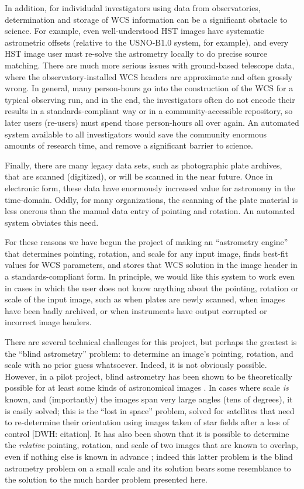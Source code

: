 \documentclass[12pt,preprint]{aastex}
\begin{document}
In addition, for individudal investigators using data from
observatories, determination and storage of WCS information can be a
significant obstacle to science.  For example, even well-understood
HST images have systematic astrometric offsets (relative to the
USNO-B1.0 system, for example), and every HST image user must re-solve
the astrometry locally to do precise source matching.  There are much
more serious issues with ground-based telescope data, where the
observatory-installed WCS headers are approximate and often grossly
wrong.  In general, many person-hours go into the construction of the
WCS for a typical observing run, and in the end, the investigators
often do not encode their results in a standards-compliant way or in a
community-accessible repository, so later users (re-users) must spend
those person-hours all over again.  An automated system available to
all investigators would save the community enormous amounts of
research time, and remove a significant barrier to science.

Finally, there are many legacy data sets, such as photographic plate
archives, that are scanned (digitized), or will be scanned in the near
future.  Once in electronic form, these data have enormously increased
value for astronomy in the time-domain.  Oddly, for many
organizations, the scanning of the plate material is less onerous than
the manual data entry of pointing and rotation.  An automated system
obviates this need.

For these reasons we have begun the project of making an ``astrometry
engine'' that determines pointing, rotation, and scale for any input
image, finds best-fit values for WCS parameters, and stores that WCS
solution in the image header in a standards-compliant form.  In
principle, we would like this system to work even in cases in which
the user does not know anything about the pointing, rotation or scale
of the input image, such as when plates are newly scanned, when images
have been badly archived, or when instruments have output corrupted or
incorrect image headers.

There are several technical challenges for this project, but perhaps
the greatest is the ``blind astrometry'' problem: to determine an
image's pointing, rotation, and scale with no prior guess whatsoever.
Indeed, it is not obviously possible.  However, in a pilot project,
blind astrometry has been shown to be theoretically possible for at
least some kinds of astronomical images \citep{harvey04a}.  In cases
where scale \emph{is} known, and (importantly) the images span very
large angles (tens of degrees), it is easily solved; this is the
``lost in space'' problem, solved for satellites that need to
re-determine their orientation using images taken of star fields after
a loss of control [DWH: citation].  It has also been shown that it is
possible to determine the \emph{relative} pointing, rotation, and
scale of two images that are known to overlap, even if nothing else is
known in advance \citep{groth86a}; indeed this latter problem is the
blind astrometry problem on a small scale and its solution bears some
resemblance to the solution to the much harder problem presented
here.
\end{document}
